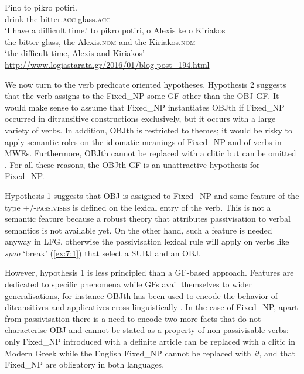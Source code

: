 \documentclass[output=paper]{langsci/langscibook}
\begin{document}
\ea%
\label{ex:7:51}
\ea \label{ex:7:51a}
\gll  Pino to pikro potiri.\\
            drink the bitter.\textsc{acc} glass.\textsc{acc}\\
\glt   `I have a difficult time.'
\ex \label{ex:7:51b}
\gll to pikro potiri, o Alexis ke o Kiriakos\\
     the bitter glass, the Alexis.\textsc{nom} and the Kiriakos.\textsc{nom}\\
\glt   `the difficult time, Alexis and Kiriakos'\\
\url{http://www.logiastarata.gr/2016/01/blog-post_194.html} 
\z
\z

We now turn to the verb predicate oriented hypotheses. Hypothesis 2 suggests that the verb assigns to the Fixed\_NP some GF other than the OBJ GF.  It would make sense to assume that Fixed\_NP instantiates OBJth if Fixed\_NP occurred in ditransitive constructions exclusively, but it occurs with a large variety of verbs. In addition, OBJth is restricted to themes; it would be risky to apply semantic roles on the idiomatic meanings of Fixed\_NP and of verbs in MWEs.  Furthermore, OBJth cannot be replaced with a clitic  but can be omitted \citep{kordoni2004}.  For all these reasons, the OBJth GF is an unattractive hypothesis for Fixed\_NP.


Hypothesis 1 suggests that OBJ is assigned to Fixed\_NP and some feature of the type \textsc{+/-passivises} is defined on the lexical entry of the verb. This is not a semantic feature because a robust theory that attributes passivisation to verbal semantics is not available yet. On the other hand, such a feature is needed anyway in LFG, otherwise the passivisation lexical rule will apply on verbs like {\normalfont \itshape spao} `break' (\ref{ex:7:1}) that select a SUBJ and an OBJ. 

However, hypothesis 1 is less principled than a GF-based approach. Features are dedicated to specific phenomena while GFs avail themselves to wider generalisations, for instance OBJth has been used to encode the behavior of ditransitives and applicatives cross-linguistically \citep{bresnanmoshi1990}.  In the case of Fixed\_NP, apart from passivisation there is a need to encode two more facts that do not characterise OBJ and cannot be stated as a property of non-passivisable verbs: only Fixed\_NP introduced with a definite article can be replaced with a clitic in Modern Greek while the English Fixed\_NP cannot be replaced with \textit{it}, and that Fixed\_NP are obligatory in both languages.
\end{document}
